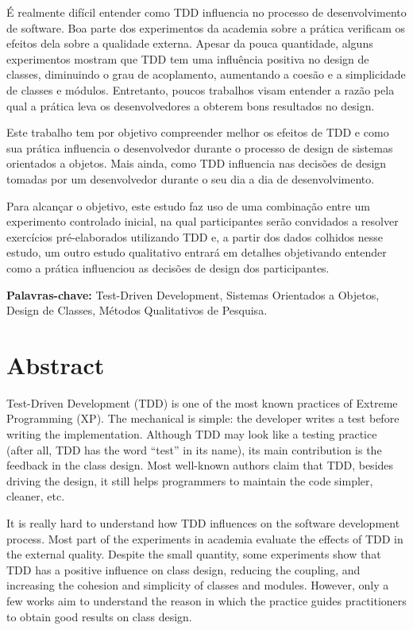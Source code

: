 \documentclass[11pt,openany,twoside,a4paper]{book}
\begin{document}
É realmente difícil entender como TDD influencia no processo de desenvolvimento
de software. Boa parte dos experimentos da
academia sobre a prática verificam os efeitos dela sobre a qualidade externa. 
Apesar da pouca quantidade, alguns experimentos mostram que TDD tem uma influência
positiva no design de classes, diminuindo o grau de acoplamento, aumentando
a coesão e a simplicidade de classes e módulos. Entretanto, poucos trabalhos visam
entender a razão pela qual a prática leva os desenvolvedores a obterem bons resultados
no design.

Este trabalho tem por objetivo compreender melhor os efeitos de TDD e como sua prática 
influencia o 
desenvolvedor durante o processo de design de sistemas orientados a objetos. Mais ainda,
como TDD influencia nas decisões de design tomadas por um desenvolvedor durante o
seu dia a dia de desenvolvimento.

Para alcançar o objetivo, este estudo faz uso de uma combinação entre um experimento controlado inicial, na qual participantes serão
convidados a resolver exercícios pré-elaborados utilizando TDD e, a partir dos dados colhidos nesse estudo, um outro
estudo qualitativo entrará em detalhes objetivando entender como a prática influenciou as decisões de design dos participantes.

\noindent \textbf{Palavras-chave:} Test-Driven Development, Sistemas Orientados
a Objetos, Design de Classes, Métodos Qualitativos de Pesquisa.

\chapter*{Abstract}

Test-Driven Development (TDD) is one of the most known practices of Extreme
Programming (XP). The mechanical is simple: the developer writes a test before
writing the implementation. Although TDD may look like a testing practice
(after all, TDD has the word ``test'' in its name), its main contribution is the
feedback in the class design. Most well-known authors claim that TDD, besides
driving the design, it still helps programmers to maintain the code simpler, 
cleaner, etc.

It is really hard to understand how TDD influences on the software development
process. Most part of the experiments in academia evaluate the effects of TDD
in the external quality. Despite the small quantity, some experiments
show that TDD has a positive influence on class design, reducing the coupling, and
increasing the cohesion and simplicity of classes and modules. However, only a
few works aim to understand the reason in which the practice guides practitioners
to obtain good results on class design.
\end{document}
